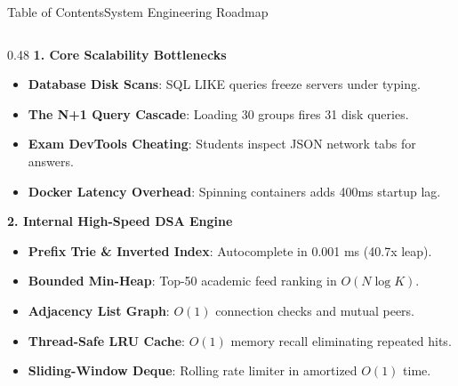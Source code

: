 \documentclass[aspectratio=169,10pt]{beamer}
\begin{document}
\begin{frame}[t]{Table of Contents}{System Engineering Roadmap}
  \begin{columns}[t]
    \begin{column}{0.48\textwidth}
      {\fontsize{8.0}{9.5}\selectfont\textbf{\textcolor{KoinexaRed}{1. Core Scalability Bottlenecks}}}\par\vspace{0.5pt}
      \begin{itemize}\setlength{\itemsep}{-1.0pt}
        \item {\fontsize{6.8}{8.0}\selectfont \textbf{Database Disk Scans}: SQL LIKE queries freeze servers under typing.}
        \item {\fontsize{6.8}{8.0}\selectfont \textbf{The N+1 Query Cascade}: Loading 30 groups fires 31 disk queries.}
        \item {\fontsize{6.8}{8.0}\selectfont \textbf{Exam DevTools Cheating}: Students inspect JSON network tabs for answers.}
        \item {\fontsize{6.8}{8.0}\selectfont \textbf{Docker Latency Overhead}: Spinning containers adds 400ms startup lag.}
      \end{itemize}
      \vspace{0.04cm}
      {\fontsize{8.0}{9.5}\selectfont\textbf{\textcolor{KoinexaOrange}{2. Internal High-Speed DSA Engine}}}\par\vspace{0.5pt}
      \begin{itemize}\setlength{\itemsep}{-1.0pt}
        \item {\fontsize{6.8}{8.0}\selectfont \textbf{Prefix Trie \& Inverted Index}: Autocomplete in 0.001 ms (40.7x leap).}
        \item {\fontsize{6.8}{8.0}\selectfont \textbf{Bounded Min-Heap}: Top-50 academic feed ranking in $O(N \log K)$.}
        \item {\fontsize{6.8}{8.0}\selectfont \textbf{Adjacency List Graph}: $O(1)$ connection checks and mutual peers.}
        \item {\fontsize{6.8}{8.0}\selectfont \textbf{Thread-Safe LRU Cache}: $O(1)$ memory recall eliminating repeated hits.}
        \item {\fontsize{6.8}{8.0}\selectfont \textbf{Sliding-Window Deque}: Rolling rate limiter in amortized $O(1)$ time.}

\end{itemize}
\end{column}
\end{columns}
\end{frame}
\end{document}
